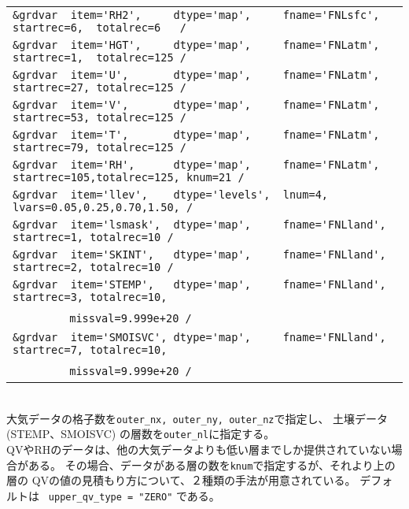 {{{\begin{tabularx}{150mm}{l}
\verb|&grdvar  item='RH2',     dtype='map',     fname='FNLsfc', startrec=6,  totalrec=6   / |  \\
\verb|&grdvar  item='HGT',     dtype='map',     fname='FNLatm', startrec=1,  totalrec=125 / |  \\
\verb|&grdvar  item='U',       dtype='map',     fname='FNLatm', startrec=27, totalrec=125 / |  \\
\verb|&grdvar  item='V',       dtype='map',     fname='FNLatm', startrec=53, totalrec=125 / |  \\
\verb|&grdvar  item='T',       dtype='map',     fname='FNLatm', startrec=79, totalrec=125 / |  \\
\verb|&grdvar  item='RH',      dtype='map',     fname='FNLatm', startrec=105,totalrec=125, knum=21 /  |  \\
\verb|&grdvar  item='llev',    dtype='levels',  lnum=4, lvars=0.05,0.25,0.70,1.50, /        |  \\
\verb|&grdvar  item='lsmask',  dtype='map',     fname='FNLland', startrec=1, totalrec=10 /  |  \\
\verb|&grdvar  item='SKINT',   dtype='map',     fname='FNLland', startrec=2, totalrec=10 /  |  \\
\verb|&grdvar  item='STEMP',   dtype='map',     fname='FNLland', startrec=3, totalrec=10,|\\
~~~~~~~~\verb| missval=9.999e+20 /|  \\
\verb|&grdvar  item='SMOISVC', dtype='map',     fname='FNLland', startrec=7, totalrec=10,|\\
~~~~~~~~\verb| missval=9.999e+20 /|  \\
\end{tabularx}
}}}\\

大気データの格子数を\verb|outer_nx, outer_ny, outer_nz|で指定し、
土壌データ(STEMP、SMOISVC) の層数を\verb|outer_nl|に指定する。\\

QVやRHのデータは、他の大気データよりも低い層までしか提供されていない場合がある。
その場合、データがある層の数を\verb|knum|で指定するが、それより上の層の
QVの値の見積もり方について、２種類の手法が用意されている。
デフォルトは \verb| upper_qv_type = "ZERO"| である。\\

\\


